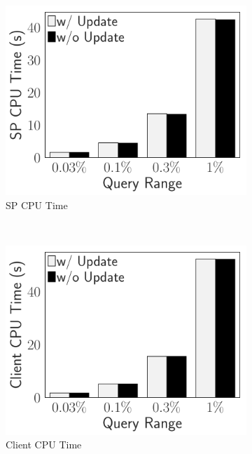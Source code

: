 \begin{figure}[t]
    \centering
    \begin{subfigure}{.33\linewidth}
        \includegraphics[width=\linewidth]{exp-figs/access-control/update_sp.pdf}
        \caption{SP CPU Time}
    \end{subfigure}~%
    \begin{subfigure}{.33\linewidth}
        \includegraphics[width=\linewidth]{exp-figs/access-control/update_user.pdf}
        \caption{Client CPU Time}
    \end{subfigure}~%
    \begin{subfigure}{.33\linewidth}

\end{subfigure}
\end{figure}
